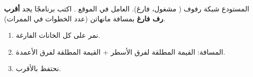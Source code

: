 \begin{statement}
المستودع شبكة رفوف  ( مشغول،  فارغ). العامل في الموقع . اكتب برنامجًا يجد \textbf{أقرب رف فارغ} بمسافة مانهاتن  (عدد الخطوات في الممرات).
\end{statement}
\begin{stepsbox}\begin{enumerate}
\item نمر على كل الخانات الفارغة.
\item المسافة: القيمة المطلقة لفرق الأسطر + القيمة المطلقة لفرق الأعمدة.
\item نحتفظ بالأقرب.
\end{enumerate}\end{stepsbox}
